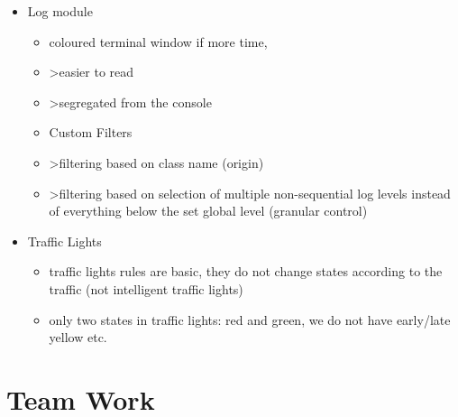 \begin{itemize}
    \item Log module
    \begin{itemize}
        \item coloured terminal window if more time,
        \item >easier to read
        \item >segregated from the console
        \item Custom Filters
        \item >filtering based on class name (origin)
        \item >filtering based on selection of multiple non-sequential log levels instead of everything below the set global level (granular control)
    \end{itemize}

     \item Traffic Lights
     \begin{itemize}
        \item traffic lights rules are basic, they do not change states according to the traffic (not intelligent traffic lights)
        \item only two states in traffic lights: red and green, we do not have early/late yellow etc.
     \end{itemize}
\end{itemize}


\section{Team Work}

